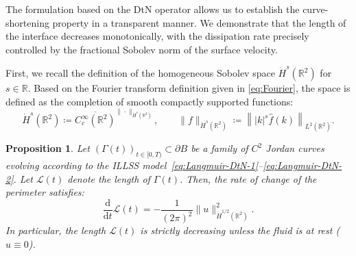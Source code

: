 \documentclass{article}
\newtheorem{proposition}[theorem]{Proposition}
\theoremstyle{remark}
\theoremstyle{definition}
\numberwithin{equation}{section}
\begin{document}
The formulation based on the DtN operator allows us to establish the curve-shortening property in a transparent manner. 
We demonstrate that the length of the interface decreases monotonically, with the dissipation rate precisely controlled by the fractional Sobolev norm of the surface velocity.

First, we recall the definition of the homogeneous Sobolev space $\dot{H}^s(\mathbb{R}^2)$ for $s \in \mathbb{R}$.
Based on the Fourier transform definition given in \eqref{eq:Fourier}, the space is defined as the completion of smooth compactly supported functions:
\begin{equation}
    \dot{H}^s(\mathbb{R}^2) \coloneqq \overline{C_c^\infty(\mathbb{R}^2)}^{\|\cdot\|_{\dot{H}^s(\mathbb{R}^2)}}, \qquad
    \|f\|_{\dot{H}^s(\mathbb{R}^2)} \coloneqq \left\| |k|^s \hat{f}(k) \right\|_{L^2(\mathbb{R}^2)}.
\end{equation}

\begin{proposition}
\label{prop:CS}
Let $(\Gamma(t))_{t \in [0,T)} \subset \partial B$ be a family of $C^2$ Jordan curves evolving according to the ILLSS model~\eqref{eq:Langmuir-DtN-1}--\eqref{eq:Langmuir-DtN-2}.
Let $\mathcal{L}(t)$ denote the length of $\Gamma(t)$.
Then, the rate of change of the perimeter satisfies:
\begin{equation}
    \frac{\mathrm{d}}{\mathrm{d}t} \mathcal{L}(t) = -\frac{1}{(2\pi)^2} \|u\|_{\dot{H}^{1/2}(\mathbb{R}^2)}^2.
\end{equation}
In particular, the length $\mathcal{L}(t)$ is strictly decreasing unless the fluid is at rest ($u \equiv 0$).
\end{proposition}
\end{document}

